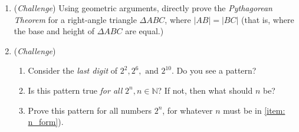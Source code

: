 \documentclass[10pt,a4paper,fleqn]{book}
\newcommand{\challenge}{(\emph{Challenge}) }
\begin{document}
\begin{enumerate}
			\item \challenge Using geometric arguments, directly prove the \emph{Pythagorean Theorem} for a right-angle triangle $\Delta ABC$, where $|AB|=|BC|$ (that is, where the base and height of $\Delta ABC$ are equal.)
			\item \challenge
				\begin{enumerate}
					\item Consider the \emph{last digit} of $2^2, 2^6, \text{ and } 2^{10}$. Do you see a pattern?
					\item Is this pattern true \emph{for all} $2^n, n\in\mathbb{N}$? If not, then what should $n$ be? \label{item: n_form}
					\item Prove this pattern for all numbers $2^n$, for whatever $n$ must be in \ref{item: n_form}).
				\end{enumerate}

		\end{enumerate}
\end{document}
